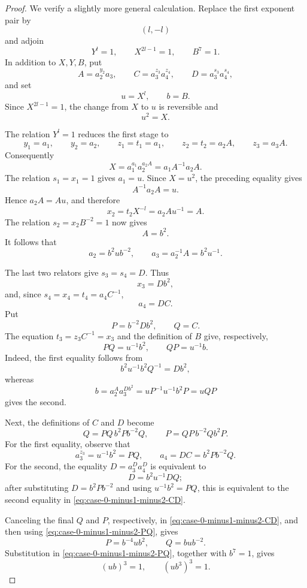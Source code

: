 \documentclass{article}
\begin{document}
\begin{proof}
We verify a slightly more general calculation.  Replace the first
exponent pair by
\[
   (l,-l)
\]
and adjoin
\[
   Y^l=1,\qquad X^{2l-1}=1,\qquad B^7=1.
\]
In addition to $X,Y,B$, put
\[
 A=a_2^{y_2}a_3,\qquad
 C=a_3^{z_3}a_4^{z_4},\qquad
 D=a_3^{s_3}a_4^{s_4},
\]
and set
\[
   u=X^l,\qquad b=B.
\]
Since $X^{2l-1}=1$, the change from $X$ to $u$ is reversible and
\[
   u^2=X.
\]

The relation $Y^l=1$ reduces the first stage to
\[
 y_1=a_1,\qquad y_2=a_2,\qquad
 z_1=t_1=a_1,\qquad z_2=t_2=a_2A,\qquad z_3=a_3A.
\]
Consequently
\[
 X=a_1^{a_1}a_2^{a_2A}=a_1A^{-1}a_2A.
\]
The relation $s_1=x_1=1$ gives $a_1=u$.  Since $X=u^2$, the preceding
equality gives
\[
   A^{-1}a_2A=u.
\]
Hence $a_2A=Au$, and therefore
\[
 x_2=t_2X^{-l}=a_2Au^{-1}=A.
\]
The relation $s_2=x_2B^{-2}=1$ now gives
\[
   A=b^2.
\]
It follows that
\[
   a_2=b^2ub^{-2},\qquad
   a_3=a_2^{-1}A=b^2u^{-1}.
\]

The last two relators give $s_3=s_4=D$.  Thus
\[
   x_3=Db^2,
\]
and, since $s_4=x_4=t_4=a_4C^{-1}$,
\[
   a_4=DC.
\]
Put
\[
   P=b^{-2}Db^2,\qquad Q=C.
\]
The equation $t_3=z_3C^{-1}=x_3$ and the definition of $B$ give,
respectively,
\begin{equation}
\label{eq:case-0-minus1-minus2-PQ}
   PQ=u^{-1}b^2,
   \qquad
   QP=u^{-1}b.
\end{equation}
Indeed, the first equality follows from
\[
 b^2u^{-1}b^2Q^{-1}=Db^2,
\]
whereas
\[
 b=a_2^{A}a_3^{Db^2}
   =uP^{-1}u^{-1}b^2P
   =uQP
\]
gives the second.

Next, the definitions of $C$ and $D$ become
\begin{equation}
\label{eq:case-0-minus1-minus2-CD}
 Q=PQ\,b^2Pb^{-2}Q,
 \qquad
 P=QP\,b^{-2}Qb^2P.
\end{equation}
For the first equality, observe that
\[
   a_3^{z_3}=u^{-1}b^2=PQ,
   \qquad
   a_4=DC=b^2Pb^{-2}Q.
\]
For the second, the equality $D=a_3^Da_4^D$ is equivalent to
\[
   D=b^2u^{-1}DQ;
\]
after substituting $D=b^2Pb^{-2}$ and using
$u^{-1}b^2=PQ$, this is equivalent to the second equality in
\eqref{eq:case-0-minus1-minus2-CD}.

Canceling the final $Q$ and $P$, respectively, in
\eqref{eq:case-0-minus1-minus2-CD}, and then using
\eqref{eq:case-0-minus1-minus2-PQ}, gives
\[
   P=b^{-4}ub^2,
   \qquad
   Q=bub^{-2}.
\]
Substitution in \eqref{eq:case-0-minus1-minus2-PQ}, together with
$b^7=1$, gives
\begin{equation}
\label{eq:case-0-minus1-minus2-ub}
   (ub)^3=1,
   \qquad
   (ub^3)^3=1.
\end{equation}


\end{proof}
\end{document}
